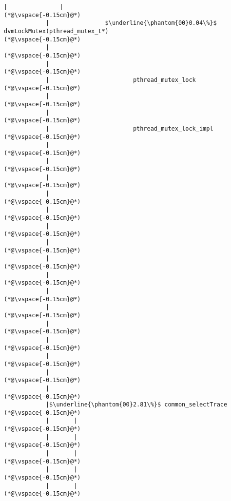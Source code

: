 \begin{lstlisting}[caption=Staattinen metodi Java$\to$C , label=profile:J2CBenchmark00001, numberbychapter=true, frame=lines, float, floatplacement=t]
            |               |
(*@\vspace{-0.15cm}@*)
            |                $\underline{\phantom{00}0.04\%}$ dvmLockMutex(pthread_mutex_t*)
(*@\vspace{-0.15cm}@*)
            |        
(*@\vspace{-0.15cm}@*)
            |        
(*@\vspace{-0.15cm}@*)
            |                        pthread_mutex_lock
(*@\vspace{-0.15cm}@*)
            |        
(*@\vspace{-0.15cm}@*)
            |        
(*@\vspace{-0.15cm}@*)
            |                        pthread_mutex_lock_impl
(*@\vspace{-0.15cm}@*)
            |        
(*@\vspace{-0.15cm}@*)
            |        
(*@\vspace{-0.15cm}@*)
            |
(*@\vspace{-0.15cm}@*)
            |
(*@\vspace{-0.15cm}@*)
            |
(*@\vspace{-0.15cm}@*)
            |
(*@\vspace{-0.15cm}@*)
            |
(*@\vspace{-0.15cm}@*)
            |
(*@\vspace{-0.15cm}@*)
            |
(*@\vspace{-0.15cm}@*)
            |
(*@\vspace{-0.15cm}@*)
            |
(*@\vspace{-0.15cm}@*)
            |
(*@\vspace{-0.15cm}@*)
            |
(*@\vspace{-0.15cm}@*)
            |
(*@\vspace{-0.15cm}@*)
            |
(*@\vspace{-0.15cm}@*)
            |
(*@\vspace{-0.15cm}@*)
            |$\underline{\phantom{00}2.81\%}$ common_selectTrace
(*@\vspace{-0.15cm}@*)
            |       |
(*@\vspace{-0.15cm}@*)
            |       |
(*@\vspace{-0.15cm}@*)
            |       |
(*@\vspace{-0.15cm}@*)
            |       |
(*@\vspace{-0.15cm}@*)
            |       |
(*@\vspace{-0.15cm}@*)

\end{lstlisting}
